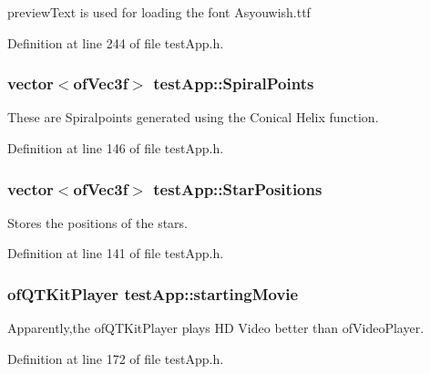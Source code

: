 preview\-Text is used for loading the font Asyouwish.\-ttf 



Definition at line 244 of file test\-App.\-h.

\hypertarget{classtest_app_af0dd2f3e3aabdb43bee49d74c156dc05}{
\subsubsection[{Spiral\-Points}]{\setlength{\rightskip}{0pt plus 5cm}vector$<$of\-Vec3f$>$ test\-App\-::\-Spiral\-Points}}\label{classtest_app_af0dd2f3e3aabdb43bee49d74c156dc05}


These are Spiralpoints generated using the Conical Helix function. 



Definition at line 146 of file test\-App.\-h.

\hypertarget{classtest_app_a68d0d30cea64a9d39a1b2deef16677ad}{
\subsubsection[{Star\-Positions}]{\setlength{\rightskip}{0pt plus 5cm}vector$<$of\-Vec3f$>$ test\-App\-::\-Star\-Positions}}\label{classtest_app_a68d0d30cea64a9d39a1b2deef16677ad}


Stores the positions of the stars. 



Definition at line 141 of file test\-App.\-h.

\hypertarget{classtest_app_a9bfe7793fa0689a991ff64174745c38f}{
\subsubsection[{starting\-Movie}]{\setlength{\rightskip}{0pt plus 5cm}of\-Q\-T\-Kit\-Player test\-App\-::starting\-Movie}}\label{classtest_app_a9bfe7793fa0689a991ff64174745c38f}


Apparently,the of\-Q\-T\-Kit\-Player plays H\-D Video better than of\-Video\-Player. 



Definition at line 172 of file test\-App.\-h.


